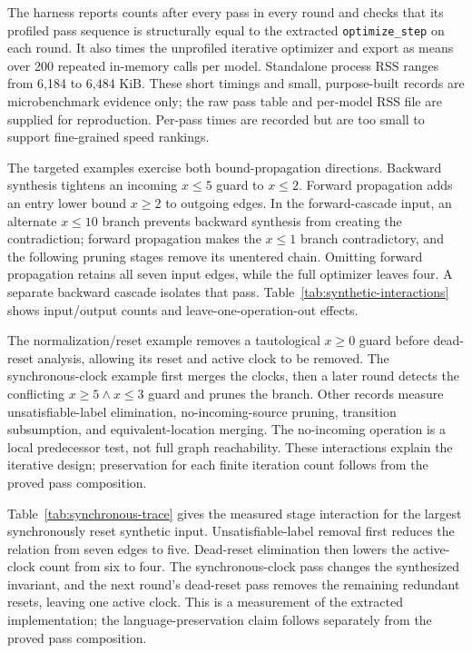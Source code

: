 The harness reports counts after every pass in every round and checks that
its profiled pass sequence is structurally equal to the extracted
\texttt{optimize\_step} on each round. It also times the unprofiled iterative
optimizer and export as means over 200 repeated in-memory calls per model.
Standalone process RSS ranges from 6,184 to 6,484 KiB. These short timings
and small, purpose-built records are microbenchmark evidence only; the raw
pass table and per-model RSS file are supplied for reproduction. Per-pass
times are recorded but are too small to support fine-grained speed rankings.

The targeted examples exercise both bound-propagation directions. Backward
synthesis tightens an incoming $x\leq5$ guard to $x\leq2$. Forward
propagation adds an entry lower bound $x\geq2$ to outgoing edges. In the
forward-cascade input, an alternate $x\leq10$ branch prevents backward
synthesis from creating the contradiction; forward propagation makes the
$x\leq1$ branch contradictory, and the following pruning stages remove its
unentered chain. Omitting forward propagation retains all seven input edges,
while the full optimizer leaves four. A separate backward cascade isolates
that pass. Table~\ref{tab:synthetic-interactions} shows input/output counts
and leave-one-operation-out effects.

The normalization/reset example removes a tautological $x\geq0$ guard before
dead-reset analysis, allowing its reset and active clock to be removed. The
synchronous-clock example first merges the clocks, then a later round detects
the conflicting $x\geq5\land x\leq3$ guard and prunes the branch. Other
records measure unsatisfiable-label elimination, no-incoming-source pruning,
transition subsumption, and equivalent-location merging. The no-incoming
operation is a local predecessor test, not full graph reachability. These
interactions explain the iterative design; preservation for each finite
iteration count follows from the proved pass composition.


Table~\ref{tab:synchronous-trace} gives the measured stage interaction for
the largest synchronously reset synthetic input. Unsatisfiable-label removal
first reduces the relation from seven edges to five. Dead-reset elimination
then lowers the active-clock count from six to four. The synchronous-clock
pass changes the synthesized invariant, and the next round's dead-reset pass
removes the remaining redundant resets, leaving one active clock. This is a
measurement of the extracted implementation; the language-preservation
claim follows separately from the proved pass composition.


